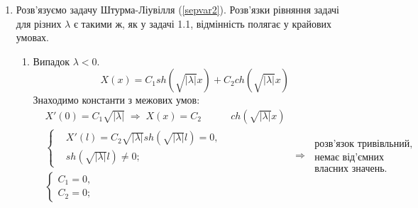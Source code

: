 \begin{enumerate}
    \item[] Розв'язуємо задачу Штурма-Ліувілля (\ref{sepvar2}). Розв'язки рівняння задачі для різних $\lambda$ є такими ж, як у задачі 1.1, відмінність полягає у крайових умовах.
    \begin{enumerate}[wide, labelindent=0pt]
        
        \item Випадок $\lambda < 0$. 
        \begin{equation*}
            X(x) = C_1 sh(\sqrt{|\lambda|}x) + C_2 ch({\sqrt{|\lambda|}x})
        \end{equation*}
        Знаходимо константи з межових умов:
        \begin{equation*}
            \begin{aligned}
                &X'(0) = C_1\sqrt{|\lambda|}
                \;\Rightarrow\;
                X(x) = C_2 &ch(\sqrt{|\lambda|}x)\\
                &\left\{ \begin{aligned}
                    &X'(l) = C_2\sqrt{|\lambda|} sh(\sqrt{|\lambda|}l) = 0, \\
                    &sh(\sqrt{|\lambda|}l) \neq 0;
                \end{aligned} \right.&\\
                &\left\{ \begin{aligned}
                    C_1 = 0, \\ 
                    C_2 = 0;
                \end{aligned} \right. \qquad\qquad\qquad\qquad&
            \end{aligned}
            \;\Rightarrow\;
            \begin{aligned}
                \text{розв'язок тривівльний,}\\
                \text{немає від'ємних}\\
                \text{власних значень.}
            \end{aligned}
        \end{equation*}


\end{enumerate}
\end{enumerate}
